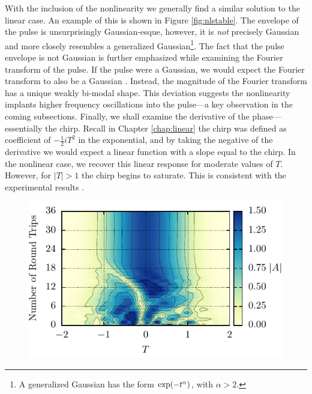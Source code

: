 \documentclass[10pt,twocolumn,a4paper]{article}
\let\originalleft\left
\let\originalright\right
\renewcommand{\left}{\mathopen{}\mathclose\bgroup\originalleft}
\renewcommand{\right}{\aftergroup\egroup\originalright}
\begin{document}
With the inclusion of the nonlinearity we generally find a similar solution to the linear case. An example of this is shown in Figure \ref{fig:nlstable}. The envelope of the pulse is unsurprisingly Gaussian-esque, however, it is \emph{not} precisely Gaussian and more closely resembles a generalized Gaussian\footnote{A generalized Gaussian has the form $\exp \left(-t^\alpha \right)$, with $\alpha > 2$.}. The fact that the pulse envelope is not Gaussian is further emphasized while examining the Fourier transform of the pulse. If the pulse were a Gaussian, we would expect the Fourier transform to also be a Gaussian \cite{debnath, gradshteyn}. Instead, the magnitude of the Fourier transform has a unique weakly bi-modal shape. This deviation suggests the nonlinearity implants higher frequency oscillations into the pulse---a key observation in the coming subsections. Finally, we shall examine the derivative of the phase---essentially the chirp. Recall in Chapter \ref{chap:linear} the chirp was defined as coefficient of $-\frac{1}{2}iT^2$ in the exponential, and by taking the negative of the derivative we would expect a linear function with a slope equal to the chirp. In the nonlinear case, we recover this linear response for moderate values of $T$. However, for $|T| > 1$ the chirp begins to saturate. This is consistent with the experimental results \cite{chen, rothenberg, tomlinson}.


\begin{figure}[htbp]
\centering
\includegraphics{Conv}
\caption{}
\label{fig:}
\end{figure}
\end{document}
